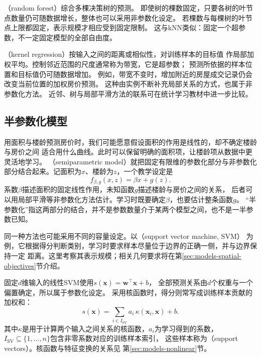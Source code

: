 （random forest）综合多棵决策树的预测。
即使树的棵数固定，只要各树的叶节点数量仍可随数据增长，整体也可以采用非参数化设定。
若棵数与每棵树的叶节点上限都固定，表示规模才相应受到固定限制。
这与kNN类似：固定一个超参数，不一定固定模型的全部自由度。

（kernel regression）按输入之间的距离或相似性，对训练样本的目标值
作局部加权平均。控制邻近范围的尺度通常称为带宽，它是超参数；
预测所依据的样本位置和目标值仍可随数据增加。
例如，带宽不变时，增加附近的房屋成交记录仍会改变当前位置的加权房价预测。
这种由实例不断补充局部关系的方式，也属于非参数化方法。
近邻、树与局部平滑方法的联系可在统计学习教材中进一步比较。

\subsection{半参数化模型}
\label{sec:models-semiparametric}

用面积与楼龄预测房价时，我们可能愿意假设面积的作用是线性的，却不确定楼龄与房价之间
适合用什么曲线。此时可以保留明确的面积项，让楼龄项从数据中更灵活地学习。
（semiparametric model）就把固定有限维的参数化部分与非参数化
部分结合起来。记面积为$x$、楼龄为$z$，一个教学设定是
\begin{equation}
  f_{\beta,g}(x,z)=\beta x+g(z).
  \label{eq:models-semiparametric}
\end{equation}
系数$\beta$描述面积的固定线性作用，未知函数$g$描述楼龄与房价之间的关系，
后者可以用局部平滑等非参数化方法估计。学习时既要确定$\beta$，也要估计整条函数$g$。
“半参数化”指这两部分的结合，并不是参数数量介于某两个模型之间，也不是一半参数已知。

同一种方法也可能采用不同的容量设定。以（support vector machine, SVM）
为例，它根据得分判断类别，学习时要求样本尽量位于边界的正确一侧，并与边界保持一定
距离。这里考察其表示规模；相关几何要求将在第\ref{sec:models-spatial-objectives}节介绍。

固定$d$维输入的线性SVM使用$s(\bm{x})=\bm{w}^{\top}\bm{x}+b$，
全部预测关系由$d$个权重与一个偏置确定，所以属于参数化设定。
采用核函数时，得分则常写成训练样本贡献的加权和：
\begin{equation}
  s(\bm{x})=\sum_{i\in I_{\mathrm{SV}}}
    a_i\,\kappa(\bm{x}_i,\bm{x})+b.
  \label{eq:models-support-vector-expansion}
\end{equation}
其中$\kappa$是用于计算两个输入之间关系的核函数，$a_i$为学习得到的系数，
$I_{\mathrm{SV}}\subseteq\{1,\ldots,n\}$包含非零系数对应的训练样本索引，
这些样本称为（support vectors）。核函数与特征变换的关系见
第\ref{sec:models-nonlinear}节。


